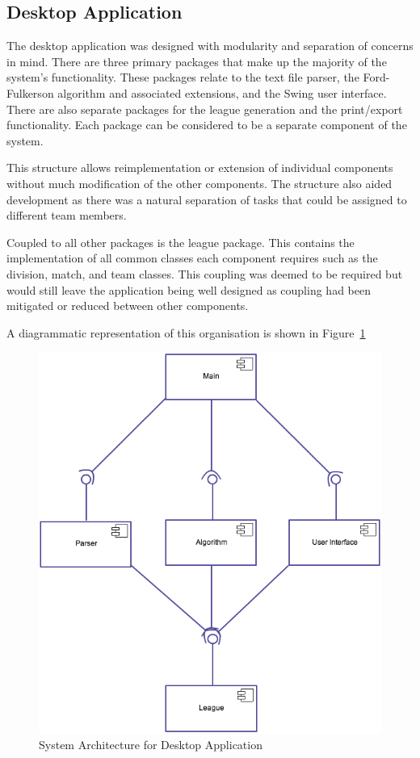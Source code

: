 \subsection{Desktop Application}

The desktop application was designed with modularity and separation of concerns
in mind. There are three primary packages that make up the majority of the
system's functionality. These packages relate to the text file parser, the Ford-
Fulkerson algorithm and associated extensions, and the Swing user interface.
There are also separate packages for the league generation and the print/export
functionality. Each package can be considered to be a separate component of the
system.

This structure allows reimplementation or extension of individual components
without much modification of the other components. The structure also aided
development as there was a natural separation of tasks that could be assigned to
different team members.

Coupled to all other packages is the league package. This contains the
implementation of all common classes each component requires such as the
division, match, and team classes. This coupling was deemed to be required but
would still leave the application being well designed as coupling had been
mitigated or reduced between other components.

A diagrammatic representation of this organisation is shown in
Figure~\ref{fig:sysArch}

\begin{figure}
\includegraphics[width=\linewidth,keepaspectratio]
{images/DesktopApplicationSystemArchitecture.png}
\caption{System Architecture for Desktop Application}
\label{fig:sysArch}
\end{figure}
